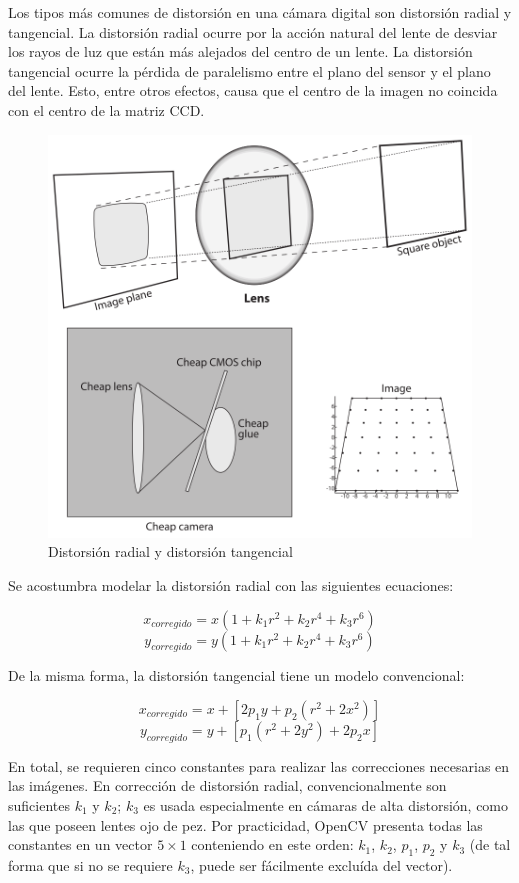 \documentclass[12pt]{article}
\makeatletter
\def\maxwidth{\ifdim\Gin@nat@width>\linewidth\linewidth
    \else\Gin@nat@width\fi}
\let\Oldincludegraphics\includegraphics
\renewcommand{\includegraphics}[1]{\Oldincludegraphics[width=.8\maxwidth]{#1}}
\makeatother
\begin{document}
    Los tipos más comunes de distorsión en una cámara digital son distorsión
radial y tangencial. La distorsión radial ocurre por la acción natural
del lente de desviar los rayos de luz que están más alejados del centro
de un lente. La distorsión tangencial ocurre la pérdida de paralelismo
entre el plano del sensor y el plano del lente. Esto, entre otros
efectos, causa que el centro de la imagen no coincida con el centro de
la matriz CCD.

    \begin{figure}[htbp]
\centering
\includegraphics{img/1-fig3.png}
\caption{Distorsión radial y distorsión tangencial}
\end{figure}

    Se acostumbra modelar la distorsión radial con las siguientes
ecuaciones:

    \[x_{corregido} = x\left(1 + k_1r^2 + k_2r^4 + k_3r^6\right)\]
\[y_{corregido} = y\left(1 + k_1r^2 + k_2r^4 + k_3r^6\right)\]

    De la misma forma, la distorsión tangencial tiene un modelo
convencional:

    \[x_{corregido} = x + \left[ 2p_1y + p_2\left( r^2 + 2x^2 \right) \right]\]
\[y_{corregido} = y + \left[ p_1\left( r^2 + 2y^2 \right) + 2p_2x \right]\]

    En total, se requieren cinco constantes para realizar las correcciones
necesarias en las imágenes. En corrección de distorsión radial,
convencionalmente son suficientes \(k_1\) y \(k_2\); \(k_3\) es usada
especialmente en cámaras de alta distorsión, como las que poseen lentes
ojo de pez. Por practicidad, OpenCV presenta todas las constantes en un
vector \(5 \times 1\) conteniendo en este orden: \(k_1\), \(k_2\),
\(p_1\), \(p_2\) y \(k_3\) (de tal forma que si no se requiere \(k_3\),
puede ser fácilmente excluída del vector).


    
    



    
    
\end{document}

